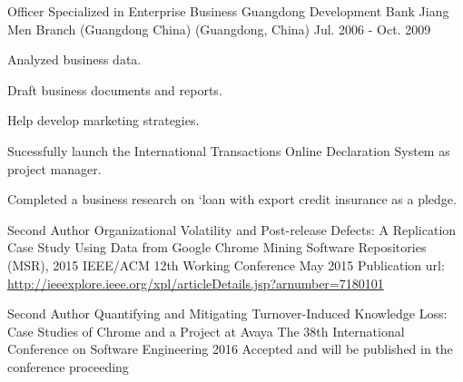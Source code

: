 \documentclass[11pt, a4paper]{awesome-cv} %
\begin{document}
\begin{cventries}
		
	\cventry
	{Officer Specialized in Enterprise Business} %
	{Guangdong Development Bank Jiang Men Branch (Guangdong China)} %
	{(Guangdong, China)} %
	{Jul. 2006 - Oct. 2009} %
	{ %
		\begin{cvitems}
				\item {Analyzed business data.}
				\item {Draft business documents and reports.}
				\item {Help develop marketing strategies.}
				\item {Sucessfully launch the International Transactions Online Declaration System as project manager.}
				\item {Completed a business research on ‘loan with export credit insurance as a pledge.}
		\end{cvitems}
	}
		
		
		
	
	
\end{cventries}

%
\newpage
{}


\begin{cventries}
	
	
	\cventry
	{Second Author} %
	{Organizational Volatility and Post-release Defects: A Replication Case Study Using Data from Google Chrome} %
	{Mining Software Repositories (MSR), 2015 IEEE/ACM 12th Working Conference} %
	{May 2015} %
    {Publication url: \url{http://ieeexplore.ieee.org/xpl/articleDetails.jsp?arnumber=7180101}
    }
	
	
	
	\cventry
	{Second Author} %
	{Quantifying and Mitigating Turnover-Induced Knowledge Loss: Case Studies of Chrome and a Project at Avaya} %
	{The 38th International Conference on Software Engineering} %
	{2016} %
    {Accepted and will be published in the conference proceeding }
	
	
\end{cventries}
%
\end{document}
